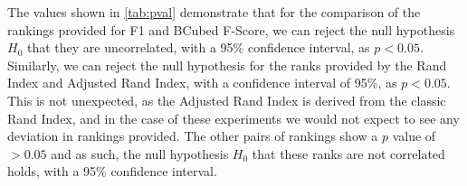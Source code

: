 \documentclass[../main.tex]{subfiles}
\begin{document}
\begin{table}[h]
\centering
{}
\caption{Calculated $p$ values for Kendall's Tau tests}
\label{tab:pval}
\end{table}

The values shown in \autoref{tab:pval} demonstrate that for the comparison of the rankings provided for F1 and BCubed F-Score, we can reject the null hypothesis $H_0$ that they are uncorrelated, with a 95\% confidence interval, as $p < 0.05$. Similarly, we can reject the null hypothesis for the ranks provided by the Rand Index and Adjusted Rand Index, with a confidence interval of 95\%, as $p < 0.05$. This is not unexpected, as the Adjusted Rand Index is derived from the classic Rand Index, and in the case of these experiments we would not expect to see any deviation in rankings provided. The other pairs of rankings show a $p$ value of $> 0.05$ and as such, the null hypothesis $H_0$ that these ranks are not correlated holds, with a 95\% confidence interval.
\end{document}
